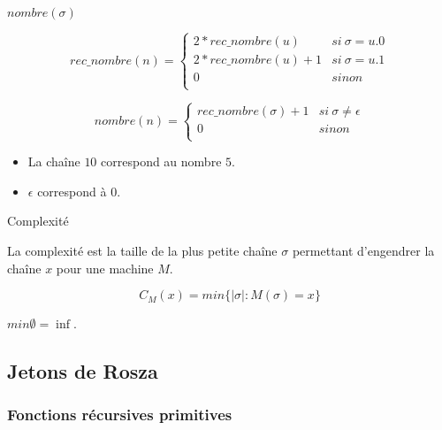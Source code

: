 \begin{definition}{$nombre(\sigma)$}
\par $$ rec\_nombre(n) = 
			\left \{
				\begin{array}{ll}
					2*rec\_nombre(u) & si~ \sigma = u.0 \\
					2*rec\_nombre(u)+1 & si~ \sigma = u.1 \\
					0 &sinon \\
				\end{array}
			\right.
	$$
\par $$ nombre(n) = 
			\left \{
				\begin{array}{ll}
					rec\_nombre(\sigma)+1 & si~ \sigma \not= \epsilon \\
					0 & sinon \\
				\end{array}
			\right.
	$$
\end{definition}

\begin{example}
\begin{itemize}
\item La chaîne $10$ correspond au nombre $5$.
\item $\epsilon$ correspond à $0$.
\end{itemize}
\end{example}

\begin{definition}{Complexité}
\par La complexité est la taille de la plus petite chaîne $\sigma$ permettant d'engendrer la chaîne $x$ pour une machine $M$.
\par $$C_M(x) = min\{|\sigma|:M(\sigma) = x\}$$
\par $min \emptyset = \inf$.
\end{definition}

	\subsection{Jetons de Rosza}
		\subsubsection{Fonctions récursives primitives}

